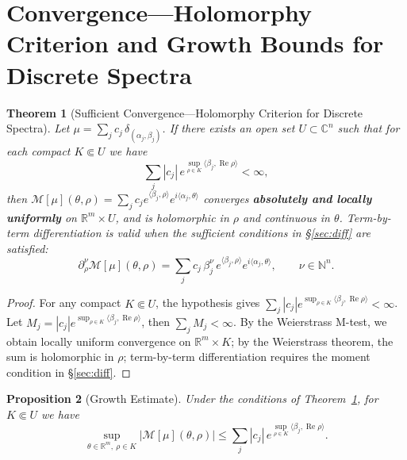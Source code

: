 \documentclass[11pt,a4paper]{article}
\newtheorem{theorem}{Theorem}[section]
\newtheorem{proposition}[theorem]{Proposition}
\theoremstyle{remark}
\DeclareMathOperator{\Re}{Re}
\begin{document}
\section{Convergence---Holomorphy Criterion and Growth Bounds for Discrete Spectra}

\begin{theorem}[Sufficient Convergence---Holomorphy Criterion for Discrete Spectra]\label{thm:discrete}
Let $\mu=\sum_j c_j\,\delta_{(\alpha_j,\beta_j)}$. If there exists an open set $U\subset\mathbb{C}^n$ such that for each compact $K\Subset U$ we have
\begin{equation}
\sum_j |c_j|\,e^{\sup_{\rho\in K}\langle\beta_j,\Re\rho\rangle}<\infty,
\end{equation}
then $\mathcal{M}[\mu](\theta,\rho)=\sum_j c_j e^{\langle\beta_j,\rho\rangle}e^{i\langle\alpha_j,\theta\rangle}$ converges \textbf{absolutely and locally uniformly} on $\mathbb{R}^m\times U$, and is holomorphic in $\rho$ and continuous in $\theta$. Term-by-term differentiation is valid when the sufficient conditions in \S\ref{sec:diff} are satisfied:
\begin{equation}
\partial_{\rho}^{\nu}\mathcal{M}[\mu](\theta,\rho)
=\sum_j c_j\,\beta_j^{\nu}\,e^{\langle\beta_j,\rho\rangle}e^{i\langle\alpha_j,\theta\rangle},\qquad \nu\in\mathbb{N}^n.
\end{equation}
\end{theorem}

\begin{proof}
For any compact $K\Subset U$, the hypothesis gives $\sum_j |c_j| e^{\sup_{\rho\in K}\langle\beta_j,\Re\rho\rangle} < \infty$. Let $M_j = |c_j| e^{\sup_{\rho\in K}\langle\beta_j,\Re\rho\rangle}$, then $\sum_j M_j < \infty$. By the Weierstrass M-test, we obtain locally uniform convergence on $\mathbb{R}^m \times K$; by the Weierstrass theorem, the sum is holomorphic in $\rho$; term-by-term differentiation requires the moment condition in \S\ref{sec:diff}.
\end{proof}

\begin{proposition}[Growth Estimate]\label{prop:growth}
Under the conditions of Theorem~\ref{thm:discrete}, for $K\Subset U$ we have
\begin{equation}
\sup_{\theta\in\mathbb{R}^m,\ \rho\in K}|\mathcal{M}[\mu](\theta,\rho)|
\le \sum_j |c_j|\,e^{\sup_{\rho\in K}\langle\beta_j,\Re\rho\rangle}.
\end{equation}
\end{proposition}
\end{document}
